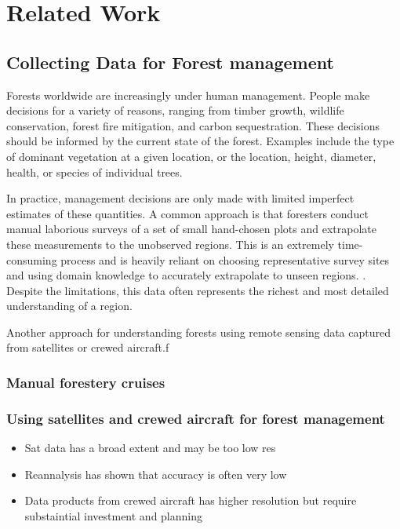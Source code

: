 
\chapter{Related Work} \label{chapBackground}

\section{Collecting Data for Forest management}
    
Forests worldwide are increasingly under human management. People make decisions for a variety of reasons, ranging from timber growth, wildlife conservation, forest fire mitigation, and carbon sequestration. These decisions should be informed by the current state of the forest. Examples include the type of dominant vegetation at a given location, or the location, height, diameter, health, or species of individual trees.

In practice, management decisions are only made with limited imperfect estimates of these quantities. A common approach is that foresters conduct manual laborious surveys of a set of small hand-chosen plots and extrapolate these measurements to the unobserved regions. This is an extremely time-consuming process and is heavily reliant on choosing representative survey sites and using domain knowledge to accurately extrapolate to unseen regions.  . Despite the limitations, this data often represents the richest and most detailed understanding of a region.

Another approach for understanding forests using remote sensing data captured from satellites or crewed aircraft.f
\subsection{Manual forestery cruises}

\subsection{Using satellites and crewed aircraft for forest management}
\begin{itemize}
    \item Sat data has a broad extent and may be too low res
    \item Reannalysis has shown that accuracy is often very low 
    \item Data products from crewed aircraft has higher resolution but require substaintial investment and planning
\end{itemize}

